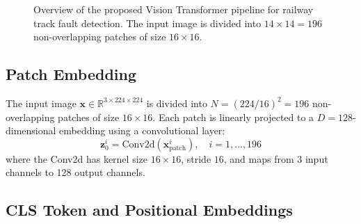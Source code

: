\documentclass[10pt,twocolumn,letterpaper]{article}
\begin{document}
\begin{figure}[t]
\centering
{}
\caption{Overview of the proposed Vision Transformer pipeline for railway track fault detection. The input image is divided into $14 \times 14 = 196$ non-overlapping patches of size $16 \times 16$.}
\label{fig:architecture}
\end{figure}

\subsection{Patch Embedding}
\label{sec:patch}

The input image $\mathbf{x} \in \mathbb{R}^{3 \times 224 \times 224}$ is divided into $N = (224/16)^2 = 196$ non-overlapping patches of size $16 \times 16$. Each patch is linearly projected to a $D = 128$-dimensional embedding using a convolutional layer:
\begin{equation}
    \mathbf{z}_0^i = \text{Conv2d}(\mathbf{x}^i_{\text{patch}}), \quad i = 1, \ldots, 196
\end{equation}
where the Conv2d has kernel size $16 \times 16$, stride $16$, and maps from 3 input channels to 128 output channels.

\subsection{CLS Token and Positional Embeddings}
\end{document}
